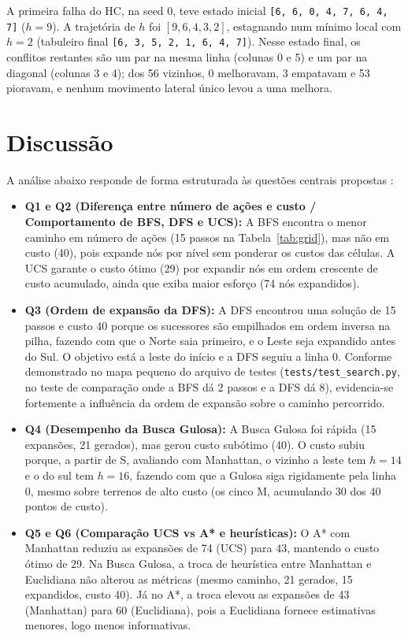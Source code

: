 \documentclass[12pt]{article}
\begin{document}
A primeira falha do HC, na seed 0, teve estado inicial \texttt{[6, 6, 0, 4, 7, 6, 4, 7]} ($h = 9$). A trajetória de $h$ foi $[9, 6, 4, 3, 2]$, estagnando num mínimo local com $h = 2$ (tabuleiro final \texttt{[6, 3, 5, 2, 1, 6, 4, 7]}). Nesse estado final, os conflitos restantes são um par na mesma linha (colunas 0 e 5) e um par na diagonal (colunas 3 e 4); dos 56 vizinhos, 0 melhoravam, 3 empatavam e 53 pioravam, e nenhum movimento lateral único levou a uma melhora.

\section{Discussão}
A análise abaixo responde de forma estruturada às questões centrais propostas \cite{russell2021}:
\begin{itemize}
    \item \textbf{Q1 e Q2 (Diferença entre número de ações e custo / Comportamento de BFS, DFS e UCS):} A BFS encontra o menor caminho em número de ações (15 passos na Tabela~\ref{tab:grid}), mas não em custo (40), pois expande nós por nível sem ponderar os custos das células. A UCS garante o custo ótimo (29) por expandir nós em ordem crescente de custo acumulado, ainda que exiba maior esforço (74 nós expandidos).
    \item \textbf{Q3 (Ordem de expansão da DFS):} A DFS encontrou uma solução de 15 passos e custo 40 porque os sucessores são empilhados em ordem inversa na pilha, fazendo com que o Norte saia primeiro, e o Leste seja expandido antes do Sul. O objetivo está a leste do início e a DFS seguiu a linha 0. Conforme demonstrado no mapa pequeno do arquivo de testes (\texttt{tests/test\_search.py}, no teste de comparação onde a BFS dá 2 passos e a DFS dá 8), evidencia-se fortemente a influência da ordem de expansão sobre o caminho percorrido.
    \item \textbf{Q4 (Desempenho da Busca Gulosa):} A Busca Gulosa foi rápida (15 expansões, 21 gerados), mas gerou custo subótimo (40). O custo subiu porque, a partir de S, avaliando com Manhattan, o vizinho a leste tem $h = 14$ e o do sul tem $h = 16$, fazendo com que a Gulosa siga rigidamente pela linha 0, mesmo sobre terrenos de alto custo (os cinco M, acumulando 30 dos 40 pontos de custo).
    \item \textbf{Q5 e Q6 (Comparação UCS vs A* e heurísticas):} O A* com Manhattan reduziu as expansões de 74 (UCS) para 43, mantendo o custo ótimo de 29. Na Busca Gulosa, a troca de heurística entre Manhattan e Euclidiana não alterou as métricas (mesmo caminho, 21 gerados, 15 expandidos, custo 40). Já no A*, a troca elevou as expansões de 43 (Manhattan) para 60 (Euclidiana), pois a Euclidiana fornece estimativas menores, logo menos informativas.

\end{itemize}
\end{document}
